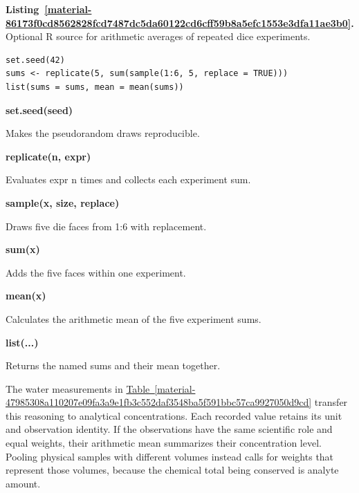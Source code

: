 \documentclass[11pt,a4paper]{article}
\newcounter{listing}
\begin{document}
\par\medskip
{}
\label{material-86173f0cd8562828fcd7487dc5da60122cd6cff59b8a5efc1553e3dfa11ae3b0}
\noindent\textbf{Listing~\ref*{material-86173f0cd8562828fcd7487dc5da60122cd6cff59b8a5efc1553e3dfa11ae3b0}.} Optional R source for arithmetic averages of repeated dice experiments.\par\nopagebreak
\begin{Verbatim}[fontsize=\footnotesize,breaklines=true,breakanywhere=true]
set.seed(42)
sums <- replicate(5, sum(sample(1:6, 5, replace = TRUE)))
list(sums = sums, mean = mean(sums))
\end{Verbatim}

\par\noindent\textbf{set.seed(seed)}

Makes the pseudorandom draws reproducible.

\par\noindent\textbf{replicate(n, expr)}

Evaluates expr n times and collects each experiment sum.

\par\noindent\textbf{sample(x, size, replace)}

Draws five die faces from 1:6 with replacement.

\par\noindent\textbf{sum(x)}

Adds the five faces within one experiment.

\par\noindent\textbf{mean(x)}

Calculates the arithmetic mean of the five experiment sums.

\par\noindent\textbf{list(...)}

Returns the named sums and their mean together.

\medskip

The water measurements in \hyperref[material-47985308a110207e09fa3a9e1fb3c552daf3548ba5f591bbc57ca9927050d9cd]{Table~\ref*{material-47985308a110207e09fa3a9e1fb3c552daf3548ba5f591bbc57ca9927050d9cd}} transfer this reasoning to analytical concentrations. Each recorded value retains its unit and observation identity. If the observations have the same scientific role and equal weights, their arithmetic mean summarizes their concentration level. Pooling physical samples with different volumes instead calls for weights that represent those volumes, because the chemical total being conserved is analyte amount.
\end{document}
